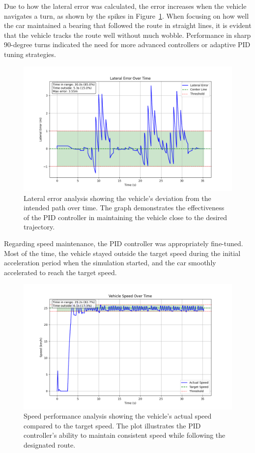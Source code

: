 \documentclass[conference]{IEEEtran}
\begin{document}
Due to how the lateral error was calculated, the error increases when the vehicle navigates a turn, as shown by the spikes in Figure~\ref{fig:lateral_error}. When focusing on how well the car maintained a bearing that followed the route in straight lines, it is evident that the vehicle tracks the route well without much wobble. Performance in sharp 90-degree turns indicated the need for more advanced controllers or adaptive PID tuning strategies.

\begin{figure}[h]
    \centering
    \includegraphics[width=\columnwidth]{Plots/lateral_error_waypoints0.png}
    \caption{Lateral error analysis showing the vehicle's deviation from the intended path over time. The graph demonstrates the effectiveness of the PID controller in maintaining the vehicle close to the desired trajectory.}
    \label{fig:lateral_error}
\end{figure}

Regarding speed maintenance, the PID controller was appropriately fine-tuned. Most of the time, the vehicle stayed outside the target speed during the initial acceleration period when the simulation started, and the car smoothly accelerated to reach the target speed.

\begin{figure}[h]
    \centering
    \includegraphics[width=\columnwidth]{Plots/speed_performance_waypoints0.png}
    \caption{Speed performance analysis showing the vehicle's actual speed compared to the target speed. The plot illustrates the PID controller's ability to maintain consistent speed while following the designated route.}
    \label{fig:speed_performance}
\end{figure}
\end{document}
